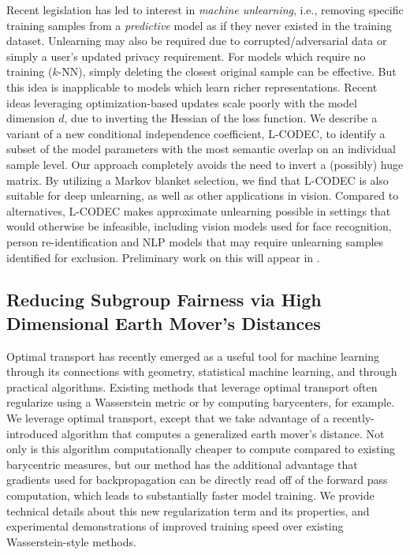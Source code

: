 Recent legislation has
led to interest in {\em machine unlearning}, i.e., removing specific training samples from a {\em predictive} model as if they never existed in the training dataset. 
Unlearning may also be required due to  corrupted/adversarial data or simply a user's updated privacy requirement.
For models which require no training ($k$-NN), 
simply deleting the closest original sample can be effective. 
But this idea is inapplicable to models which learn richer 
representations.
Recent ideas leveraging optimization-based updates
scale poorly with the model dimension $d$,  
due to 
inverting the Hessian of the loss function. %
We describe
a variant of a new conditional independence coefficient, 
L-CODEC, to identify a subset of the model parameters with the most semantic overlap on an individual sample level. 
Our approach completely avoids the need to invert a (possibly) huge matrix. 
By utilizing a Markov blanket selection, 
we find
that L-CODEC is also suitable for deep unlearning,
as well as other applications in vision.
Compared to alternatives, L-CODEC makes approximate unlearning possible 
in settings that would otherwise be infeasible, 
including vision models used for face recognition, 
person re-identification 
and NLP models that may require unlearning samples identified for exclusion.
Preliminary work on this will appear in \citep{lcodec}.


\subsection{Reducing Subgroup Fairness via High Dimensional Earth Mover's Distances}

Optimal transport has recently emerged as a useful tool for machine learning through its connections with geometry, statistical machine learning, and through practical algorithms. Existing methods that leverage optimal transport often  regularize using  a Wasserstein metric or by computing barycenters, for example. %
We leverage optimal transport, except that we take advantage of a recently-introduced algorithm that computes a generalized earth mover's distance.
Not only is this algorithm computationally cheaper to compute compared to existing barycentric measures, but our method has the additional  advantage that gradients used for backpropagation can be directly read off of the forward pass computation, which leads to substantially faster model training.
We provide technical details about this new regularization term and its properties, 
and 
experimental demonstrations of improved training speed over existing Wasserstein-style methods.

